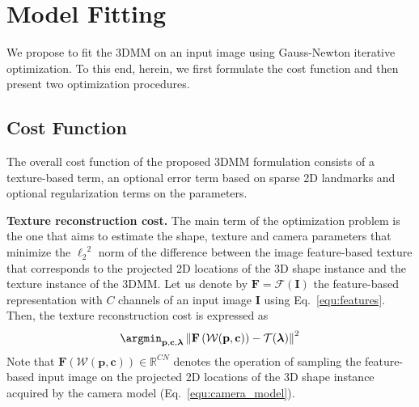 %
\section{Model Fitting}
\label{sec:fitting}

We propose to fit the 3DMM on an input image using Gauss-Newton iterative
optimization. To this end, herein, we first formulate the cost function and
then present two optimization procedures.

%
%
%
\subsection{Cost Function}
The overall cost function of the proposed 3DMM formulation consists of a
texture-based term, an optional error term based on sparse 2D landmarks and
optional regularization terms on the parameters.

%
\textbf{Texture reconstruction cost.} The main term of the optimization problem
is the one that aims to estimate the shape, texture and camera parameters that
minimize the ${\ell_2}^2$ norm of the difference between the image feature-based texture that corresponds to the projected 2D locations of the 3D shape instance and the texture instance of the 3DMM. 
Let us denote by $\mathbf{F}=\mathcal{F}(\mathbf{I})$ the feature-based representation with $C$ channels of an input image $\mathbf{I}$ using Eq.~\ref{equ:features}. 
Then, the texture reconstruction cost is expressed as
%
\begin{equation}
\argmin_{\mathbf{p}, \mathbf{c}, \boldsymbol{\lambda}}
\left\lVert\mathbf{F}\left(\mathcal{W}(\mathbf{p},\mathbf{c})\right) - \mathcal{T}(\boldsymbol{\lambda})\right\rVert^2
\label{equ:data_cost}
\end{equation}
%
Note that $\mathbf{F}\left(\mathcal{W}(\mathbf{p},\mathbf{c})\right)\in\mathbb{R}^{CN}$ denotes
the operation of sampling the feature-based input image on the projected 2D locations of the 3D shape instance acquired by the camera model (Eq.~\ref{equ:camera_model}).

